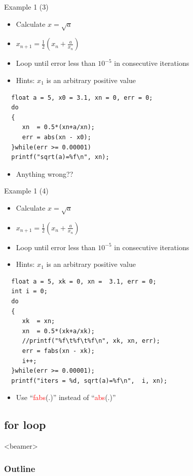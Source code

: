 \begin{frame}[fragile]{Example 1 (3)}
\begin{itemize}
	\item {Calculate $x=\sqrt{a}$}
	\item {$x_{n+1}=\frac{1}{2}(x_n+\frac{a}{x_n})$}
	\item {Loop until error less than $10^{-5}$ in consecutive iterations}
	\item {Hints: $x_1$ is an arbitrary positive value}
\end{itemize}
\begin{lstlisting}
  float a = 5, x0 = 3.1, xn = 0, err = 0;
  do
  {
     xn  = 0.5*(xn+a/xn);
     err = abs(xn - x0);
  }while(err >= 0.00001)
  printf("sqrt(a)=%f\n", xn);
\end{lstlisting}
\begin{itemize}
	\item {Anything wrong??}
\end{itemize}
\end{frame}

\begin{frame}[fragile]{Example 1 (4)}
\begin{itemize}
	\item {Calculate $x=\sqrt{a}$}
	\item {$x_{n+1}=\frac{1}{2}(x_n+\frac{a}{x_n})$}
	\item {Loop until error less than $10^{-5}$ in consecutive iterations}
	\item {Hints: $x_1$ is an arbitrary positive value}
\end{itemize}
\begin{lstlisting}
  float a = 5, xk = 0, xn =  3.1, err = 0;
  int i = 0;
  do
  {
     xk  = xn;
     xn  = 0.5*(xk+a/xk);
     //printf("%f\t%f\t%f\n", xk, xn, err);
     err = fabs(xn - xk);
     i++;
  }while(err >= 0.00001);
  printf("iters = %d, sqrt(a)=%f\n",  i, xn);
\end{lstlisting}
\begin{itemize}
	\item {Use ``\textcolor{red}{fabs}(.)'' instead of ``\textcolor{red}{abs}(.)''}
\end{itemize}
\end{frame}

\subsection{for loop}
\begin{frame}<beamer>
    \frametitle{Outline}
\end{frame}


